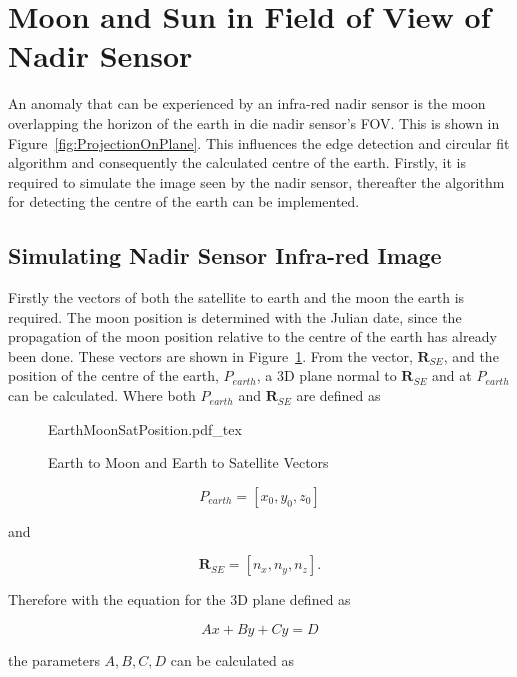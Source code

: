 \section{Moon and Sun in Field of View of Nadir Sensor}
An anomaly that can be experienced by an infra-red nadir sensor is the moon overlapping the horizon of the earth in die nadir sensor's FOV. This is shown in Figure~\ref{fig:ProjectionOnPlane}. This influences the edge detection and circular fit algorithm \cite{Wessels2018, Helgard2008} and consequently the calculated centre of the earth. Firstly, it is required to simulate the image seen by the nadir sensor, thereafter the algorithm for detecting the centre of the earth can be implemented.

\subsection{Simulating Nadir Sensor Infra-red Image}
Firstly the vectors of both the satellite to earth and the moon the earth is required. The moon position is determined with the Julian date, since the propagation of the moon position relative to the centre of the earth has already been done. These vectors are shown in Figure~\ref{fig:EarthMoonSatPosition}. From the vector, $\mathbf{R}_{SE}$, and the position of the centre of the earth, $P_{earth}$, a 3D plane normal to $\mathbf{R}_{SE}$ and at $P_{earth}$ can be calculated. Where both $P_{earth}$ and $\mathbf{R}_{SE}$ are defined as

\begin{figure}[!htb]
	\centering
	\def\svgwidth{14cm}
	{EarthMoonSatPosition.pdf_tex}
	\caption{Earth to Moon and Earth to Satellite Vectors}
	\label{fig:EarthMoonSatPosition}
\end{figure}

\begin{equation}
	P_{earth} = [x_0, y_0, z_0]
\end{equation}

and  

\begin{equation}
	\mathbf{R}_{SE} = [n_x, n_y, n_z].
\end{equation}

Therefore with the equation for the 3D plane defined as 

\begin{equation}
Ax + By + Cy = D
\end{equation}

the parameters $A, B, C, D$ can be calculated as

